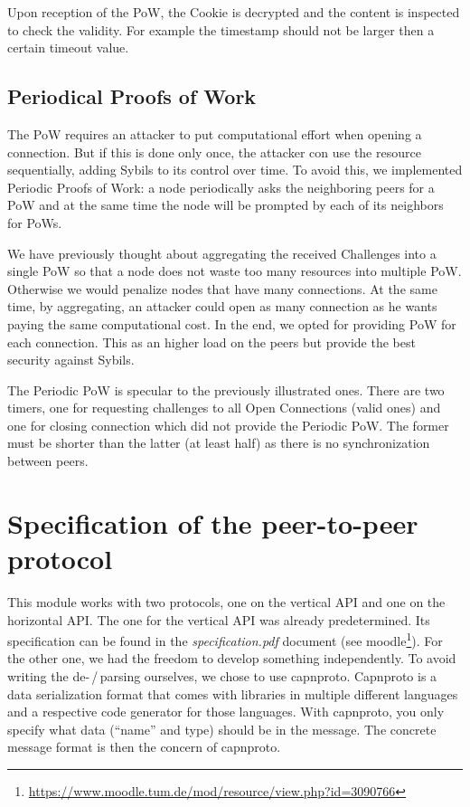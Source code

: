 \documentclass[a4paper,english,10pt,NET]{tumarticle}
\begin{document}
Upon reception of the PoW, the Cookie is decrypted and the content is inspected to check the validity. For example the timestamp should not be larger then a certain timeout value.

\subsection{Periodical Proofs of Work}

The PoW requires an attacker to put computational effort when opening a connection. But if this is done only once, the attacker con use the resource sequentially, adding Sybils to its control over time. To avoid this, we implemented Periodic Proofs of Work: a node periodically asks the neighboring peers for a PoW and at the same time the node will be prompted by each of its neighbors for PoWs. 

We have previously thought about aggregating the received Challenges into a single PoW so that a node does not waste too many resources into multiple PoW. Otherwise we would penalize nodes that have many connections. At the same time, by aggregating, an attacker could open as many connection as he wants paying the same computational cost. In the end, we opted for providing PoW for each connection. This as an higher load on the peers but provide the best security against Sybils.

The Periodic PoW is specular to the previously illustrated ones. There are two timers, one for requesting challenges to all Open Connections (valid ones) and one for closing connection which did not provide the Periodic PoW. The former must be shorter than the latter (at least half) as there is no synchronization between peers.  

\section{Specification of the peer-to-peer protocol} \label{sec:msgtypes}
This module works with two protocols, one on the vertical API and one on the horizontal API.
The one for the vertical API was already predetermined.
Its specification can be found in the \emph{specification.pdf} document (see moodle\footnote{\url{https://www.moodle.tum.de/mod/resource/view.php?id=3090766}}).
For the other one, we had the freedom to develop something independently.
To avoid writing the de-\,/\,parsing ourselves, we chose to use capnproto.
Capnproto is a data serialization format that comes with libraries in multiple different languages and a respective code generator for those languages.
With capnproto, you only specify what data (\enquote{name} and type) should be in the message.
The concrete message format is then the concern of capnproto.
\end{document}

